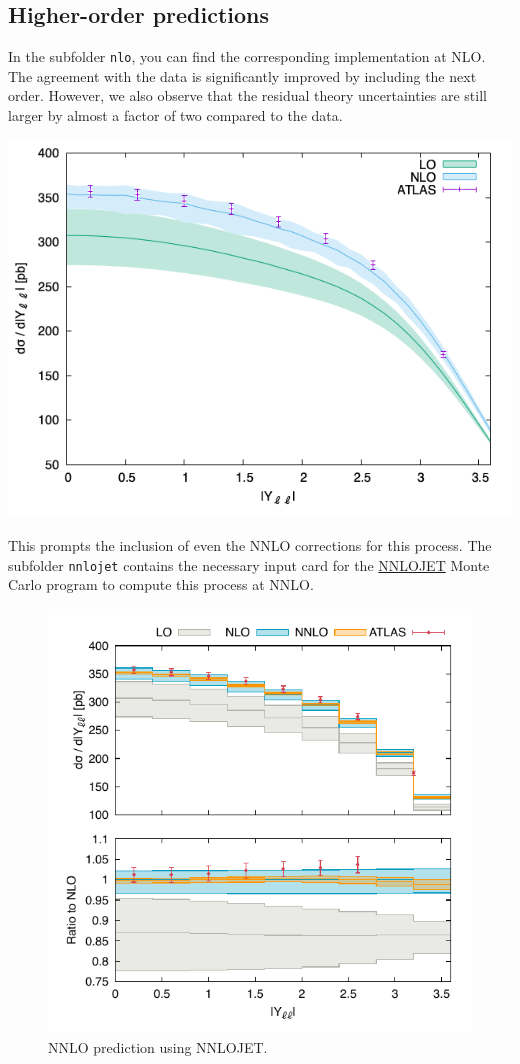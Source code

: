 \documentclass[11pt]{article}
\begin{document}
\subsection{Higher-order predictions}
\label{sec:orgdca2a4a}
In the subfolder \texttt{nlo}, you can find the corresponding implementation at NLO.
The agreement with the data is significantly improved by including the next order.
However, we also observe that the residual theory uncertainties are still larger by almost a factor of two compared to the data.

\begin{center}
\includegraphics[width=.9\linewidth]{Yll_nlo.png}
\label{}
\end{center}

This prompts the inclusion of even the NNLO corrections for this process.
The subfolder \texttt{nnlojet} contains the necessary input card for the \href{https://nnlojet.hepforge.org/}{NNLOJET} Monte Carlo program to compute this process at NNLO.

\begin{figure}[htbp]
\centering
\includegraphics[width=.9\linewidth]{./nnlojet/nnlojet_abs_yz.pdf}
\caption{NNLO prediction using NNLOJET.}
\end{figure}
\end{document}
